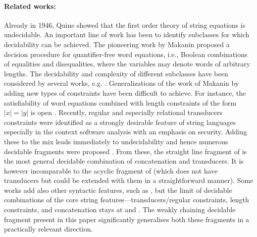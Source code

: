\documentclass[sigplan,review,anonymous]{acmart}\settopmatter{printfolios=true,printccs=false,printacmref=false}
\begin{document}








\paragraph{Related works:} 
Already in 1946, Quine \cite{quine1946concatenation} showed that the first order theory
of string equations is undecidable.
%
An important line of work has been to identify subclasses
for which decidability can be achieved.
%
The pioneering work by Makanin \cite{makanin1977problem} proposed a decision
procedure for quantifier-free word equations, i.e., Boolean combinations of
equalities and disequalities, where the variables may denote words of 
arbitrary lengths.
%
The decidability and complexity of different subclasses
have been considered by several works, e.g.
\cite{plandowski1999satisfiability,plandowski2006efficient,matiyasevich2008computation,robson1999quadratic,schulz1990makanin,ganesh2012word,ganesh2016undecidability}.
Generalizations of the work of Makanin by adding
new types of constraints have been difficult to achieve.
%
For instance, the satisfiability of word equations combined with length
constraints of the form $\left|x\right|=\left|y\right|$ is open
\cite{buchi1990definability}.
%
Recently, 
regular and especially relational transducers constraints were identified
%
as a strongly desirable feature of string languages 
%
especially in the context software analysis with an emphasis on security. 
%
Adding these to the mix leads immediately to undecidability \cite{morvan2000rational}
%
and hence numerous decidable fragments were proposed \cite{abdulla2014string,barcelo2013graph,lin2016string,chen2017decidable,chen2019decision}. 
%
From these, the straight line fragment of \cite{lin2016string} is the most general decidable combination of concatenation and transducers. It is however incomparable to the acyclic fragment of \cite{abdulla2014string} (which does not have transducers but could be extended with them in a straightforward manner).
%
Some works add also other syntactic features, such as \cite{chen2017decidable,chen2019decision}, 
but the limit of decidable combinations of the core string features---transducers/regular constraints, length constraints, and concatenation stays at \cite{lin2016string} and \cite{abdulla2014string}.
%
The weakly chaining decidable fragment present in this paper significantly generalises both these fragments in a practically relevant direction.
\end{document}
